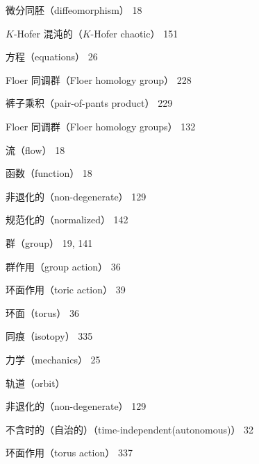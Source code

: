 {\noindent\hspace*{1.5em}微分同胚（diffeomorphism） 18\par
\noindent\hspace*{3em}$K$-Hofer 混沌的（$K$-Hofer chaotic） 151\par
\noindent\hspace*{1.5em}方程（equations） 26\par
\noindent\hspace*{1.5em}Floer 同调群（Floer homology group） 228\par
\noindent\hspace*{3em}裤子乘积（pair-of-pants product） 229\par
\noindent\hspace*{1.5em}Floer 同调群（Floer homology groups） 132\par
\noindent\hspace*{1.5em}流（flow） 18\par
\noindent\hspace*{1.5em}函数（function） 18\par
\noindent\hspace*{3em}非退化的（non-degenerate） 129\par
\noindent\hspace*{3em}规范化的（normalized） 142\par
\noindent\hspace*{1.5em}群（group） 19, 141\par
\noindent\hspace*{1.5em}群作用（group action） 36\par
\noindent\hspace*{3em}环面作用（toric action） 39\par
\noindent\hspace*{3em}环面（torus） 36\par
\noindent\hspace*{1.5em}同痕（isotopy） 335\par
\noindent\hspace*{1.5em}力学（mechanics） 25\par
\noindent\hspace*{1.5em}轨道（orbit）\par
\noindent\hspace*{3em}非退化的（non-degenerate） 129\par
\noindent\hspace*{1.5em}不含时的（自治的）（time-independent(autonomous)） 32\par
\noindent\hspace*{1.5em}环面作用（torus action） 337\par
}
